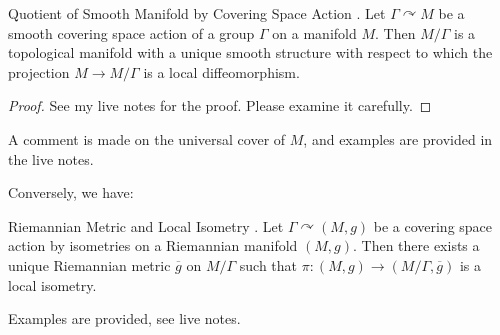 \documentclass{article}
\begin{document}
\begin{Proposition}{Quotient of Smooth Manifold by Covering Space Action}
.  Let $\Gamma \curvearrowright M$ be a smooth covering space action of a group $\Gamma$ on a manifold $M$. Then $M/\Gamma$ is a topological manifold with a unique smooth structure with respect to which the projection $M \rightarrow M/\Gamma$ is a local diffeomorphism.
\end{Proposition}

\begin{proof}
  See my live notes for the proof. Please examine it carefully.
\end{proof}

A comment is made on the universal cover of $M$, and examples are provided in the live notes.

Conversely, we have:

\begin{Proposition}{Riemannian Metric and Local Isometry}
.  Let $\Gamma \curvearrowright (M, g)$ be a covering space action by isometries on a Riemannian manifold $(M, g)$. Then there exists a unique Riemannian metric $\overline{g}$ on $M / \Gamma$ such that $\pi: (M, g) \rightarrow (M / \Gamma, \overline{g})$ is a local isometry.
\end{Proposition}

Examples are provided, see live notes.

\printindex
\end{document}
